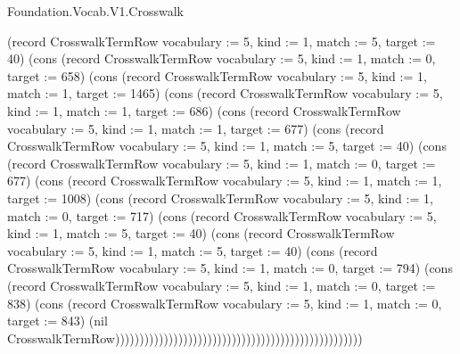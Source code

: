 \begin{lexlean}{Foundation.Vocab.V1.Crosswalk}
\begin{semanticmodule}
{(record CrosswalkTermRow {vocabulary := 5, kind := 1, match := 5, target := 40}) (cons (record CrosswalkTermRow {vocabulary := 5, kind := 1, match := 0, target := 658}) (cons (record CrosswalkTermRow {vocabulary := 5, kind := 1, match := 1, target := 1465}) (cons (record CrosswalkTermRow {vocabulary := 5, kind := 1, match := 1, target := 686}) (cons (record CrosswalkTermRow {vocabulary := 5, kind := 1, match := 1, target := 677}) (cons (record CrosswalkTermRow {vocabulary := 5, kind := 1, match := 5, target := 40}) (cons (record CrosswalkTermRow {vocabulary := 5, kind := 1, match := 0, target := 677}) (cons (record CrosswalkTermRow {vocabulary := 5, kind := 1, match := 1, target := 1008}) (cons (record CrosswalkTermRow {vocabulary := 5, kind := 1, match := 0, target := 717}) (cons (record CrosswalkTermRow {vocabulary := 5, kind := 1, match := 5, target := 40}) (cons (record CrosswalkTermRow {vocabulary := 5, kind := 1, match := 5, target := 40}) (cons (record CrosswalkTermRow {vocabulary := 5, kind := 1, match := 0, target := 794}) (cons (record CrosswalkTermRow {vocabulary := 5, kind := 1, match := 0, target := 838}) (cons (record CrosswalkTermRow {vocabulary := 5, kind := 1, match := 0, target := 843}) (nil CrosswalkTermRow)))))))))))))))))))))))))))))))))))))))))))))))))))
}


\end{semanticmodule}
\end{lexlean}
